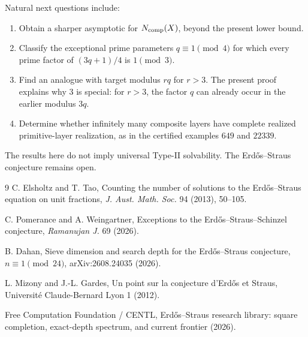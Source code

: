 \documentclass[11pt]{article}
\theoremstyle{definition}
\begin{document}
Natural next questions include:
\begin{enumerate}
\item Obtain a sharper asymptotic for $N_{\rm comp}(X)$, beyond the present lower bound.
\item Classify the exceptional prime parameters $q\equiv1\pmod4$ for which every prime factor of $(3q+1)/4$ is $1\pmod3$.
\item Find an analogue with target modulus $rq$ for $r>3$.  The present proof explains why $3$ is special: for $r>3$, the factor $q$ can already occur in the earlier modulus $3q$.
\item Determine whether infinitely many composite layers have complete realized primitive-layer realization, as in the certified examples $649$ and $22339$.
\end{enumerate}

The results here do not imply universal Type-II solvability.  The Erd\H{o}s--Straus conjecture remains open.

\begin{thebibliography}{9}
C. Elsholtz and T. Tao,
Counting the number of solutions to the Erd\H{o}s--Straus equation on unit fractions,
\emph{J. Aust. Math. Soc.} 94 (2013), 50--105.

C. Pomerance and A. Weingartner,
Exceptions to the Erd\H{o}s--Straus--Schinzel conjecture,
\emph{Ramanujan J.} 69 (2026).

B. Dahan,
Sieve dimension and search depth for the Erd\H{o}s--Straus conjecture, $n\equiv1\pmod{24}$,
arXiv:2608.24035 (2026).

L. Mizony and J.-L. Gardes,
Un point sur la conjecture d'Erd\H{o}s et Straus,
Universit\'e Claude-Bernard Lyon 1 (2012).

Free Computation Foundation / CENTL,
Erd\H{o}s--Straus research library: square completion, exact-depth spectrum, and current frontier (2026).
\end{thebibliography}
\end{document}
